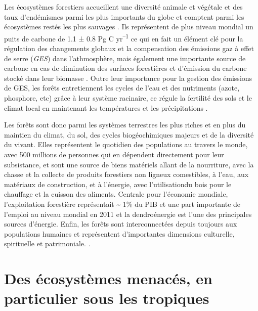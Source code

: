 \documentclass[
  11pt,
  french,
  A4paper,
  extrafontsizes,onecolumn,openright
  ]{memoir}
\begin{document}
Les écosystèmes forestiers accueillent une diversité animale et végétale
et des taux d'endémismes parmi les plus importants du globe
\autocite{Myers2000} et comptent parmi les écosystèmes restés les plus
sauvages \autocite{Mittermeier2003}. Ils représentent de plus niveau
mondial un puits de carbone de 1.1 ± 0.8 Pg C yr\textsuperscript{--1}
\autocite{Pan2011} ce qui en fait un élément clé pour la régulation des
changements globaux et la compensation des émissions gaz à effet de
serre (\emph{GES}) dans l'athmosphère, mais également une importante
source de carbone en cas de diminution des surfaces forestières et
d'émission du carbone stocké dans leur biomasse \autocite{Roy2017}.
Outre leur importance pour la gestion des émissions de GES, les forêts
entretiennent les cycles de l'eau et des nutriments (azote, phosphore,
etc) grâce à leur système racinaire, ce régule la fertilité des sols et
le climat local en maintenant les températures et les précipitations
\autocites{Malhi2008}{Isbell2017}.

Les forêts sont donc parmi les systèmes terrestres les plus riches et en
plus du maintien du climat, du sol, des cycles biogéochimiques majeurs
et de la diversité du vivant. Elles représentent le quotidien des
populations au travers le monde, avec 500 millions de personnes qui en
dépendent directement pour leur subsistance, et sont une source de biens
matériels allant de la nourriture, avec la chasse et la collecte de
produits forestiers non ligneux comestibles, à l'eau, aux matériaux de
construction, et à l'énergie, avec l'utilisationdu bois pour le
chauffage et la cuisson des aliments. Centrale pour l'économie mondiale,
l'exploitation forestière représentait \textasciitilde{} 1\% du PIB et
une part importante de l'emploi au niveau mondial en 2011 et la
dendroénergie est l'une des principales sources d'énergie. Enfin, les
forêts sont interconnectées depuis toujours aux populations humaines et
représentent d'importantes dimensions culturelle, spirituelle et
patrimoniale. \autocites{CBDdiversity2011}{FAO2014}.

\section{Des écosystèmes menacés, en particulier sous les
tropiques}\label{des-ecosystemes-menaces-en-particulier-sous-les-tropiques}
\end{document}
